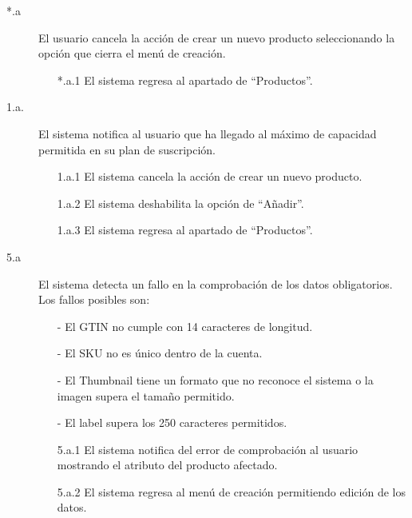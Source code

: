 \begin{description}
    \item[*.a] El usuario cancela la acción de crear un nuevo producto seleccionando la opción que cierra el menú de creación.
    \begin{enumerate}
        \item[*.a.1] El sistema regresa al apartado de \enquote{Productos}.
    \end{enumerate}

    \item[1.a.] El sistema notifica al usuario que ha llegado al máximo de capacidad permitida en su plan de suscripción.
    \begin{enumerate}
        \item[1.a.1] El sistema cancela la acción de crear un nuevo producto.
        \item[1.a.2] El sistema deshabilita la opción de \enquote{Añadir}.
        \item[1.a.3] El sistema regresa al apartado de \enquote{Productos}.
    \end{enumerate}

    \item[5.a] El sistema detecta un fallo en la comprobación de los datos obligatorios. Los fallos posibles son:
    \begin{enumerate}
        \item[-] El GTIN no cumple con 14 caracteres de longitud.
        \item[-] El SKU no es único dentro de la cuenta.
        \item[-] El Thumbnail tiene un formato que no reconoce el sistema o la imagen supera el tamaño permitido.
        \item[-] El label supera los 250 caracteres permitidos.
    \end{enumerate}
    \begin{enumerate}
        \item[5.a.1] El sistema notifica del error de comprobación al usuario mostrando el atributo del producto afectado.
        \item[5.a.2] El sistema regresa al menú de creación permitiendo edición de los datos.
    \end{enumerate}
\end{description}

